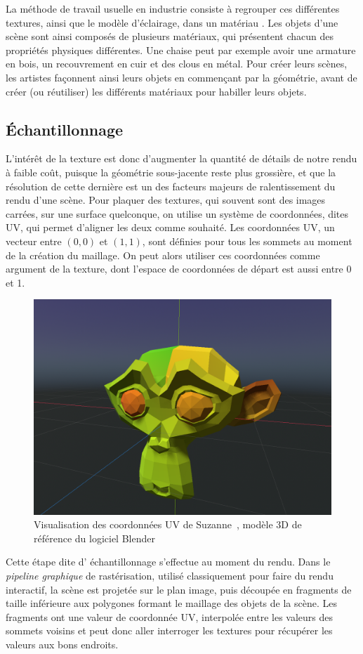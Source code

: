 La méthode de travail usuelle en industrie consiste à regrouper ces différentes textures, ainsi que le modèle d'éclairage, dans un \og matériau \fg. Les objets d'une scène sont ainsi composés de plusieurs matériaux, qui présentent chacun des propriétés physiques différentes. Une chaise peut par exemple avoir une armature en bois, un recouvrement en cuir et des clous en métal. Pour créer leurs scènes, les artistes façonnent ainsi leurs objets en commençant par la géométrie, avant de créer (ou réutiliser) les différents matériaux pour habiller leurs objets.

\subsection*{Échantillonnage}

L'intérêt de la texture est donc d'augmenter la quantité de détails de notre rendu à faible coût, puisque la géométrie sous-jacente reste plus grossière, et que la résolution de cette dernière est un des facteurs majeurs de ralentissement du rendu d'une scène. Pour plaquer des textures, qui souvent sont des images carrées, sur une surface quelconque, on utilise un système de coordonnées, dites UV, qui permet d'aligner les deux comme souhaité. Les coordonnées UV, un vecteur entre $(0, 0)$ et $(1, 1)$, sont définies pour tous les sommets au moment de la création du maillage. On peut alors utiliser ces coordonnées comme argument de la texture, dont l'espace de coordonnées de départ est aussi entre 0 et 1.

\bigskip

\begin{figure}
    \centering
    \includegraphics[width=.55\textwidth]{contenu/resources/images/uv_suzanne}
    \caption[Coordonnées UV du modèle Suzanne]{Visualisation des coordonnées UV de Suzanne~\cite{suzanne-uv}, modèle 3D de référence du logiciel Blender}
    \label{fig:uv-suzanne}
\end{figure}

Cette étape dite d' \og échantillonnage \fg s'effectue au moment du rendu. Dans le \textit{pipeline graphique} de rastérisation, utilisé classiquement pour faire du rendu interactif, la scène est projetée sur le plan image, puis découpée en \og fragments \fg de taille inférieure aux polygones formant le maillage des objets de la scène. Les fragments ont une valeur de coordonnée UV, interpolée entre les valeurs des sommets voisins et peut donc aller interroger les textures pour récupérer les valeurs aux bons endroits.


